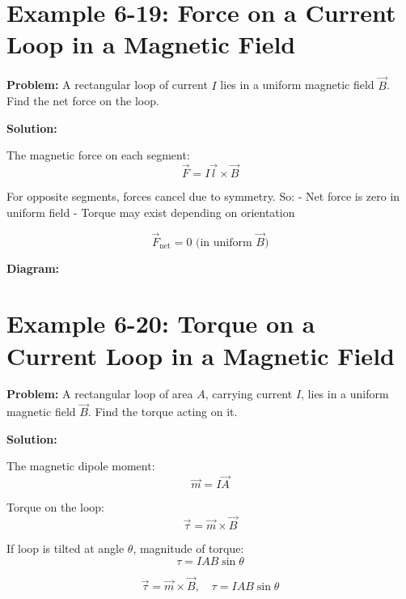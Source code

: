 \documentclass[12pt]{article}
\begin{document}
\section*{Example 6-19: Force on a Current Loop in a Magnetic Field}

\textbf{Problem:}  
A rectangular loop of current \( I \) lies in a uniform magnetic field \( \vec{B} \). Find the net force on the loop.

\textbf{Solution:}

The magnetic force on each segment:
\[
\vec{F} = I \vec{l} \times \vec{B}
\]

For opposite segments, forces cancel due to symmetry. So:
- Net force is zero in uniform field
- Torque may exist depending on orientation

\begin{tcolorbox}
\[
\boxed{\vec{F}_{\text{net}} = 0 \text{ (in uniform } \vec{B} \text{)}}
\]
\end{tcolorbox}

\textbf{Diagram:}
\begin{center}
\end{center}



\section*{Example 6-20: Torque on a Current Loop in a Magnetic Field}

\textbf{Problem:}  
A rectangular loop of area \( A \), carrying current \( I \), lies in a uniform magnetic field \( \vec{B} \). Find the torque acting on it.

\textbf{Solution:}

The magnetic dipole moment:
\[
\vec{m} = I \vec{A}
\]

Torque on the loop:
\[
\vec{\tau} = \vec{m} \times \vec{B}
\]

If loop is tilted at angle \( \theta \), magnitude of torque:
\[
\tau = I A B \sin\theta
\]

\begin{tcolorbox}
\[
\boxed{\vec{\tau} = \vec{m} \times \vec{B}}, \quad
\boxed{\tau = I A B \sin\theta}
\]
\end{tcolorbox}
\end{document}
